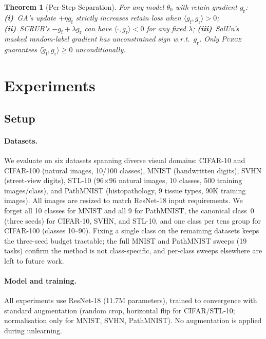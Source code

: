 \documentclass[letterpaper]{article} %
\newcommand{\ours}{\textsc{Purge}}
\newcommand{\gf}{g_{\mathrm{f}}}
\newcommand{\gr}{g_{\mathrm{r}}}
\newcommand{\gproj}{\tilde{g}_{\mathrm{f}}}
\newtheorem{theorem}{Theorem}
\begin{document}
\begin{theorem}[Per-Step Separation]\label{thm:separation}
For any model $\theta_0$ with retain gradient $\gr$:
\textbf{(i)}~GA's update $+\eta\gf$ strictly increases retain loss when $\langle \gf, \gr \rangle > 0$;
\textbf{(ii)}~SCRUB's $-\gf + \lambda\gr$ can have $\langle \cdot, \gr \rangle < 0$ for any fixed $\lambda$;
\textbf{(iii)}~SalUn's masked random-label gradient has unconstrained sign w.r.t.\ $\gr$.
Only \ours{} guarantees $\langle \gproj, \gr \rangle \ge 0$ unconditionally.
\end{theorem}

\section{Experiments}\label{sec:experiments}

\subsection{Setup}

\paragraph{Datasets.}
We evaluate on six datasets spanning diverse visual domains: CIFAR-10 and CIFAR-100 \citep{krizhevsky2009cifar} (natural images, 10/100 classes), MNIST \citep{lecun1998mnist} (handwritten digits), SVHN \citep{netzer2011svhn} (street-view digits), STL-10 \citep{coates2011stl10} (96$\times$96 natural images, 10 classes, 500 training images/class), and PathMNIST \citep{yang2023medmnist} (histopathology, 9 tissue types, 90K training images).
All images are resized to match ResNet-18 input requirements.
We forget all 10 classes for MNIST and all 9 for PathMNIST, the canonical class~0 (three seeds) for CIFAR-10, SVHN, and STL-10, and one class per tens group for CIFAR-100 (classes 10--90). Fixing a single class on the remaining datasets keeps the three-seed budget tractable; the full MNIST and PathMNIST sweeps (19 tasks) confirm the method is not class-specific, and per-class sweeps elsewhere are left to future work.

\paragraph{Model and training.}
All experiments use ResNet-18 \citep{he2016resnet} (11.7M parameters), trained to convergence with standard augmentation (random crop, horizontal flip for CIFAR/STL-10; normalisation only for MNIST, SVHN, PathMNIST).
No augmentation is applied during unlearning.
\end{document}
